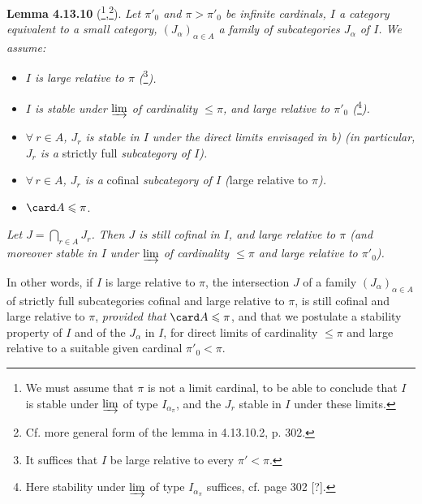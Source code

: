 \textbf{Lemma 4.13.10} (\footnote[125]{We must assume that $\pi$ is not a limit cardinal, to be able to conclude that $I$ is stable under $\varinjlim$ of type $I_{\alpha_\pi}$, and the $J_r$ stable in $I$ under these limits.},\footnote[126]{Cf. more general form of the lemma in 4.13.10.2, p. 302.}). \textit{Let $\pi'_0$ and $\pi>\pi'_0$ be infinite cardinals, $I$ a category equivalent to a small category, $(J_\alpha)_{\alpha\in A}$ a family of subcategories $J_\alpha$ of $I$. We assume:}
\begin{itemize}
\item[\cercle{a}] \textit{$I$ is large relative to $\pi$ (}\footnote[127]{It suffices that $I$ be large relative to every $\pi'<\pi$.}\textit{).} %
\item[\cercle{b}] \textit{$I$ is stable under $\varinjlim$ of cardinality $\leqslant\pi$, and large relative to $\pi'_0$ (}\footnote[128]{Here stability under $\varinjlim$ of type $I_{\alpha_\pi}$ suffices, cf. page 302 [?].}\textit{).} %
\end{itemize}

\begin{itemize}
\item[\cercle{c}] \textit{$\forall\ r\in A$, $J_r$ is stable in $I$ under the direct limits envisaged in b) (in particular, $J_r$ is a} strictly full \textit{subcategory of $I$).} %
\item[\cercle{d}] \textit{$\forall\, r\in A$, $J_r$ is a} cofinal \textit{subcategory of $I$ (}large relative to $\pi$\textit{).}
\item[\cercle{e}] $\card A\leqslant\pi$.
\end{itemize}
\textit{Let $J=\bigcap_{r\in A}J_r$. Then $J$ is still cofinal in $I$, and large relative to $\pi$ (and moreover stable in $I$ under $\varinjlim$ of cardinality $\leqslant\pi$ and large relative to $\pi'_0$).}

In other words, if $I$ is large relative to $\pi$, the intersection $J$ of a family $(J_\alpha)_{\alpha\in A}$ of strictly full subcategories cofinal and large relative to $\pi$, is still
cofinal and large relative to $\pi$, \textit{provided that} $\card A\leqslant\pi$, and that we postulate a stability property of $I$ and of the $J_\alpha$ in $I$, for direct limits of cardinality $\leqslant\pi$ and large relative to a suitable given cardinal $\pi'_0<\pi$.

